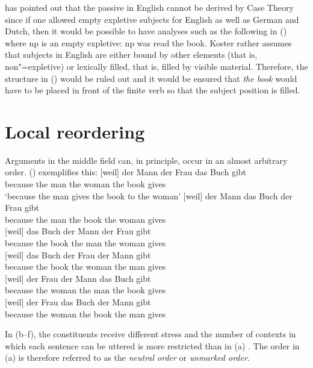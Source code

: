\noindent
\citet[]{Koster86a} has pointed out that the passive in English cannot be derived by Case
Theory since if one allowed empty expletive subjects for English as well as German and Dutch, then it would be possible
to have analyses such as the following in () where np is an empty expletive:
\ea
np was read the book.
\z
Koster rather assumes that subjects in English are either bound by other elements (that is, non"=expletive) or lexically filled, that
is, filled by visible material.
Therefore, the structure in () would be ruled out and it would be ensured that \emph{the book} would have to be placed in front
of the finite verb so that the subject position is filled.

\section{Local reordering}
\label{sec-GB-lokale-Umstellung}

Arguments in the middle field can, in principle, occur in an almost arbitrary order. () exemplifies this:
\eal
\label{ex-gb-umstellung}
\ex 
\gll {}[weil] der Mann der Frau das Buch gibt\\
     \spacebr{}because the man the woman the book gives\\
\glt `because the man gives the book to the woman'
\ex 
\gll {}[weil] der Mann das Buch der Frau gibt\\
     \spacebr{}because the man the book the woman gives\\
\ex\label{ex-das-buch-der-mann-der-frau-gibt} 
\gll {}[weil] das Buch der Mann der Frau gibt\\
     \spacebr{}because the book the man the woman gives\\
\ex 
\gll {}[weil] das Buch der Frau der Mann gibt\\
     \spacebr{}because the book the woman the man gives\\
\ex 
\gll {}[weil] der Frau der Mann das Buch gibt\\
     \spacebr{}because the woman the man the book gives\\
\ex 
\gll {}[weil] der Frau das Buch der Mann gibt\\
     \spacebr{}because the woman the book the man gives\\
\zl

\noindent
In (b--f), the constituents receive different stress and the number of contexts in which each
sentence can be uttered is more restricted than in (a) \citep{Hoehle82a}. The order in (a)
is therefore referred to as the \emph{neutral order} or \emph{unmarked order}.

